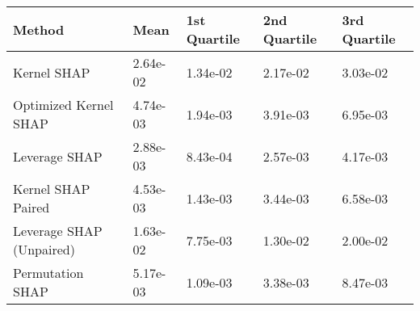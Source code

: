 \begin{tabular}{lllll}
  \toprule
  \textbf{Method} & \textbf{Mean} & \textbf{1st Quartile} & \textbf{2nd Quartile} & \textbf{3rd Quartile} \\ \midrule 
Kernel SHAP & 2.64e-02 & 1.34e-02 & 2.17e-02 & 3.03e-02\\
Optimized Kernel SHAP & \cellcolor{bronze!60}4.74e-03 & 1.94e-03 & 3.91e-03 & \cellcolor{bronze!60}6.95e-03\\
Leverage SHAP & \cellcolor{gold!60}2.88e-03 & \cellcolor{gold!60}8.43e-04 & \cellcolor{gold!60}2.57e-03 & \cellcolor{gold!60}4.17e-03\\
Kernel SHAP Paired & \cellcolor{silver!60}4.53e-03 & \cellcolor{bronze!60}1.43e-03 & \cellcolor{bronze!60}3.44e-03 & \cellcolor{silver!60}6.58e-03\\
Leverage SHAP (Unpaired) & 1.63e-02 & 7.75e-03 & 1.30e-02 & 2.00e-02\\
Permutation SHAP & 5.17e-03 & \cellcolor{silver!60}1.09e-03 & \cellcolor{silver!60}3.38e-03 & 8.47e-03\\
\bottomrule
\end{tabular}